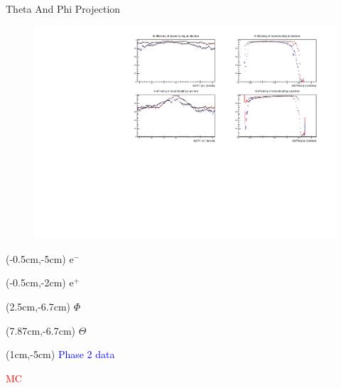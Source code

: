 \documentclass[10pt]{beamer}
\begin{document}
\begin{frame}{Theta And Phi Projection}
	\begin{figure}
		\centering
		\includegraphics[width=\textwidth]{Plots/Eff/MCDataEff}
	\end{figure}

	\begin{textblock*}{0.3\textwidth}(-0.5cm,-5cm)
		$\textrm{e}^-$
	\end{textblock*}
	\begin{textblock*}{0.3\textwidth}(-0.5cm,-2cm)
		$\textrm{e}^+$
	\end{textblock*}


	\begin{textblock*}{0.3\textwidth}(2.5cm,-6.7cm)
		$\Phi$
	\end{textblock*}


	\begin{textblock*}{0.3\textwidth}(7.87cm,-6.7cm)
	$\Theta$
\end{textblock*}


\begin{textblock*}{0.5\textwidth}(1cm,-5cm)
	\textcolor{blue}{Phase 2 data}
	
	\textcolor{red}{MC}
	
	
\end{textblock*}
	
\end{frame}
\end{document}
